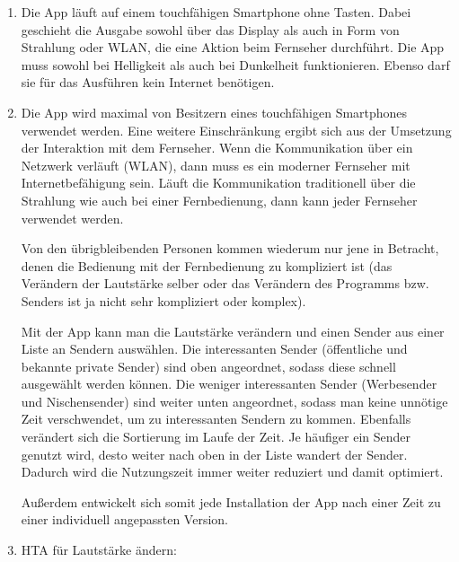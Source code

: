 \documentclass[a4paper,10pt]{scrartcl}
\begin{document}
\kopf
\renewcommand{\figurename}{Figure}


	\begin{enumerate}
		\item 
		Die App läuft auf einem touchfähigen Smartphone ohne Tasten. Dabei geschieht die Ausgabe sowohl über das Display als auch in Form von Strahlung oder WLAN, die eine Aktion beim Fernseher durchführt. Die App muss sowohl bei Helligkeit als auch bei Dunkelheit funktionieren. Ebenso darf sie für das Ausführen kein Internet benötigen.
		\item 
		Die App wird maximal von Besitzern eines touchfähigen Smartphones verwendet werden. Eine weitere Einschränkung ergibt sich aus der Umsetzung der Interaktion mit dem Fernseher. Wenn die Kommunikation über ein Netzwerk verläuft (WLAN), dann muss es ein moderner Fernseher mit Internetbefähigung sein. Läuft die Kommunikation traditionell über die Strahlung wie auch bei einer Fernbedienung, dann kann jeder Fernseher verwendet werden.
		
		Von den übrigbleibenden Personen kommen wiederum nur jene in Betracht, denen die Bedienung mit der Fernbedienung zu kompliziert ist (das Verändern der Lautstärke selber oder das Verändern des Programms bzw. Senders ist ja nicht sehr kompliziert oder komplex).
		
		Mit der App kann man die Lautstärke verändern und einen Sender aus einer Liste an Sendern auswählen. Die interessanten Sender (öffentliche und bekannte private Sender) sind oben angeordnet, sodass diese schnell ausgewählt werden können. Die weniger interessanten Sender (Werbesender und Nischensender) sind weiter unten angeordnet, sodass man keine unnötige Zeit verschwendet, um zu interessanten Sendern zu kommen. Ebenfalls verändert sich die Sortierung im Laufe der Zeit. Je häufiger ein Sender genutzt wird, desto weiter nach oben in der Liste wandert der Sender. Dadurch wird die Nutzungszeit immer weiter reduziert und damit optimiert.

		Außerdem entwickelt sich somit jede Installation der App nach einer Zeit zu einer individuell angepassten Version.
		
		\item HTA für Lautstärke ändern: \\
\begin{tikzpicture}[
	goal/.style={rectangle,draw,fill=yellow!40,align=left},
	plan/.style={align=left},
	level 1/.style={sibling distance=7.7em},
	nextLevel/.style={level distance=40ex},
  	nextLevel2/.style={level distance=30ex},
  	nextLevel3/.style={level distance=18ex}]
	

\end{tikzpicture}
\end{enumerate}
\end{document}
